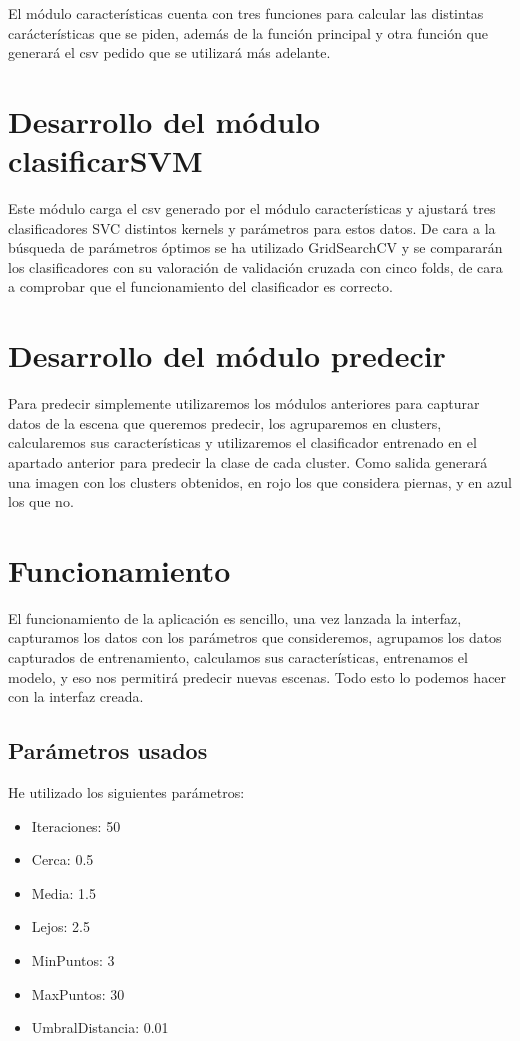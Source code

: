 \documentclass[12pt, spanish]{article}
\begin{document}
El módulo características cuenta con tres funciones para calcular las distintas carácterísticas que se piden, además de la función principal y otra función que generará el csv pedido que se utilizará más adelante.

\section{Desarrollo del módulo clasificarSVM}

Este módulo carga el csv generado por el módulo características y ajustará tres clasificadores SVC distintos kernels y parámetros para estos datos. De cara a la búsqueda de parámetros óptimos se ha utilizado GridSearchCV y se compararán los clasificadores con su valoración de validación cruzada con cinco folds, de cara a comprobar que el funcionamiento del clasificador es correcto.

\section{Desarrollo del módulo predecir}

Para predecir simplemente utilizaremos los módulos anteriores para capturar datos de la escena que queremos predecir, los agruparemos en clusters, calcularemos sus características y utilizaremos el clasificador entrenado en el apartado anterior para predecir la clase de cada cluster. Como salida generará una imagen con los clusters obtenidos, en rojo los que considera piernas, y en azul los que no.


\section{Funcionamiento}

El funcionamiento de la aplicación es sencillo, una vez lanzada la interfaz, capturamos los datos con los parámetros que consideremos, agrupamos los datos capturados de entrenamiento, calculamos sus características, entrenamos el modelo, y eso nos permitirá predecir nuevas escenas. Todo esto lo podemos hacer con la interfaz creada.

\subsection{Parámetros usados}

He utilizado los siguientes parámetros:

\begin{itemize}
    \item Iteraciones: 50
    \item Cerca: 0.5
    \item Media: 1.5
    \item Lejos: 2.5
    \item MinPuntos: 3
    \item MaxPuntos: 30
    \item UmbralDistancia: 0.01
\end{itemize}
\end{document}
